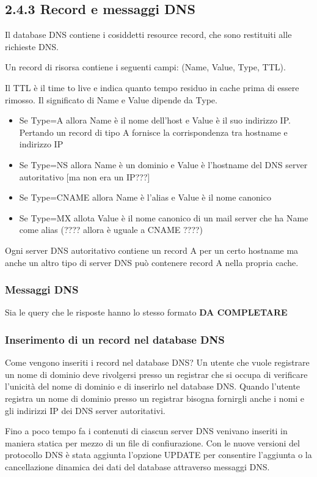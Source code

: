 \documentclass{book}
\begin{document}
\subsection*{2.4.3 Record e messaggi DNS}
Il database DNS contiene i cosiddetti resource record, che sono restituiti alle richieste DNS.


Un record di risorsa contiene i seguenti campi: (Name, Value, Type, TTL).

Il TTL è il time to live e indica quanto tempo residuo in cache prima di essere rimosso. Il significato di Name e Value dipende da Type.
\begin{itemize}
	\item Se Type=A allora Name è il nome dell'host e Value è il suo indirizzo IP. Pertando un record di tipo A fornisce la corrispondenza tra hostname e indirizzo IP
	\item Se Type=NS allora Name è un dominio e Value è l'hostname del DNS server autoritativo [ma non era un IP???]
	\item Se Type=CNAME allora Name è l'alias e Value è il nome canonico
	\item Se Type=MX allota Value è il nome canonico di un mail server che ha Name come alias (???? allora è uguale a CNAME ????)
\end{itemize}

Ogni server DNS autoritativo contiene un record A per un certo hostname ma anche un altro tipo di server DNS può contenere record A nella propria cache.

\subsubsection*{Messaggi DNS}
Sia le query che le risposte hanno lo stesso formato
\textbf{DA COMPLETARE}

\subsubsection*{Inserimento di un record nel database DNS}
Come vengono inseriti i record nel database DNS? Un utente che vuole registrare un nome di dominio deve rivolgersi presso un registrar che si occupa di verificare l'unicità del nome di dominio e di inserirlo nel database DNS. Quando l'utente registra un nome di dominio presso un registrar bisogna fornirgli anche i nomi e gli indirizzi IP dei DNS server autoritativi.

Fino a poco tempo fa i contenuti di ciascun server DNS venivano inseriti in maniera statica per mezzo di un file di confiurazione. Con le nuove versioni del protocollo DNS è stata aggiunta l'opzione UPDATE per consentire l'aggiunta o la cancellazione dinamica dei dati del database attraverso messaggi DNS.
\end{document}
